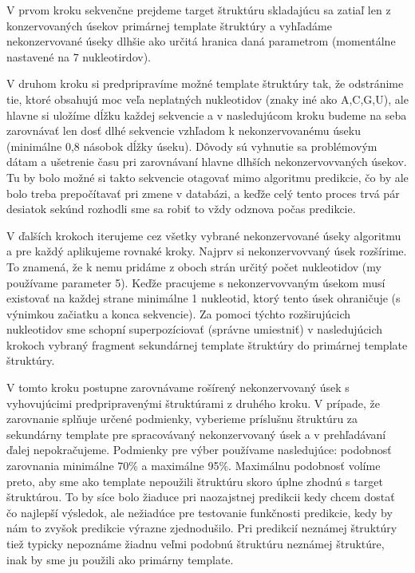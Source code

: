 \indent V prvom kroku sekvenčne prejdeme target štruktúru skladajúcu sa zatiaľ len z konzervovaných úsekov primárnej template štruktúry a vyhľadáme nekonzervované úseky dlhšie ako určitá hranica daná parametrom (momentálne nastavené na 7 nukleotirdov).


\indent V druhom kroku si predpripravíme možné template štruktúry tak, že odstránime tie, ktoré obsahujú moc veľa neplatných nukleotidov (znaky iné ako A,C,G,U), ale hlavne si uložíme dĺžku každej sekvencie a v nasledujúcom kroku budeme na seba zarovnávať len dosť dlhé sekvencie vzhľadom k nekonzervovanému úseku (minimálne 0,8 násobok dĺžky úseku). Dôvody sú vyhnutie sa problémovým dátam a ušetrenie času pri zarovnávaní hlavne dlhších nekonzervovvaných úsekov. Tu by bolo možné si takto sekvencie otagovať mimo algoritmu predikcie, čo by ale bolo treba prepočítavať pri zmene v databázi, a keďže celý tento proces trvá pár desiatok sekúnd rozhodli sme sa robiť to vždy odznova počas predikcie.


\indent V ďalších krokoch iterujeme cez všetky vybrané nekonzervované úseky algoritmu a pre každý aplikujeme rovnaké kroky. Najprv si nekonzervovvaný úsek rozšírime. To znamená, že k nemu pridáme z oboch strán určitý počet nukleotidov (my používame parameter 5). Keďže pracujeme s nekonzervovvaným úsekom musí existovať na každej strane minimálne 1 nukleotid, ktorý tento úsek ohraničuje (s výnimkou začiatku a konca sekvencie). Za pomoci týchto rozširujúcich nukleotidov sme schopní superpozíciovať (správne umiestniť) v nasledujúcich krokoch vybraný fragment sekundárnej template štruktúry do primárnej template štruktúry.


\indent V tomto kroku postupne zarovnávame rošírený nekonzervovaný úsek s vyhovujúcimi predpripravenými štruktúrami z druhého kroku. V prípade, že zarovnanie splňuje určené podmienky, vyberieme príslušnu štruktúru za sekundárny template  pre spracovávaný nekonzervovaný úsek a v prehľadávaní ďalej nepokračujeme. Podmienky pre výber používame nasledujúce: podobnosť zarovnania minimálne 70\% a maximálne 95\%. Maximálnu podobnosť volíme preto, aby sme ako template nepoužili štruktúru skoro úplne zhodnú s target štruktúrou. To by síce bolo žiaduce pri naozajstnej predikcii kedy chcem dostať čo najlepší výsledok, ale nežiadúce pre testovanie funkčnosti predikcie, kedy by nám to zvyšok predikcie výrazne zjednodušilo. Pri predikcií neznámej štruktúry tiež typicky nepoznáme žiadnu veľmi podobnú štruktúru neznámej štruktúre, inak by sme ju použili ako primárny template. 



